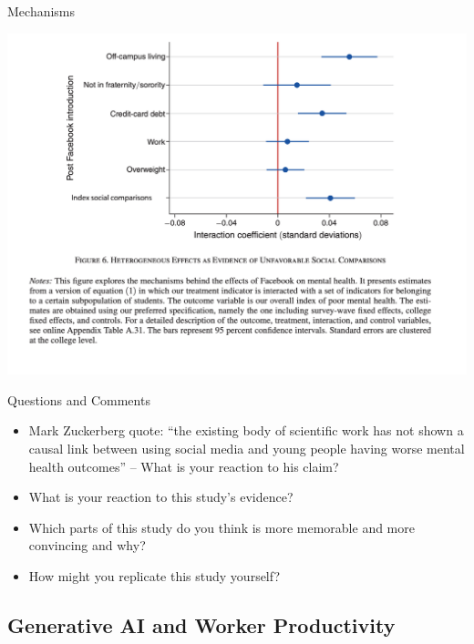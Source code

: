 \documentclass{beamer}
\begin{document}
\begin{frame}{Mechanisms}
\begin{center}
\includegraphics[scale=0.35]{./lecture_includes/facebook_7}
\end{center}
\end{frame}

\begin{frame}{Questions and Comments}

\begin{itemize}
\item Mark Zuckerberg quote: ``the existing body of scientific work has not shown a causal link between using social media and young people having worse mental health outcomes'' -- What is your reaction to his claim?
\item What is your reaction to this study's evidence?  
\item Which parts of this study do you think is more memorable and more convincing and why?
\item How might you replicate this study yourself?

\end{itemize}

\end{frame}


\subsection{Generative AI and Worker Productivity}
\end{document}
